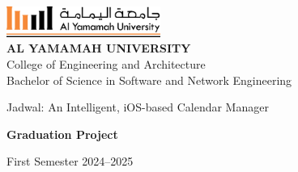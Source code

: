 \documentclass[12pt,a4paper,twoside]{report}
\begin{document}
\begin{singlespace}
    \begin{titlepage}
        \begin{center}
            \vspace*{1cm}
            \includegraphics[height=1cm]{images/yu-logo.png}\\[1cm]
            {\Large\bfseries AL YAMAMAH UNIVERSITY}\\[0.5cm]
            {\large College of Engineering and Architecture}\\[0.5cm]
            {\large Bachelor of Science in Software and Network Engineering}\\[2cm]
            {\Huge\bfseries
            \begin{spacing}{1}
                Jadwal: An Intelligent, iOS-based Calendar Manager
            \end{spacing}
            }
            \vspace{2cm}
            {\Large\bfseries Graduation Project}\\[2cm]
            \begin{center}
                \setlength{\fboxsep}{10pt}
                \setlength{\fboxrule}{1pt}
            \end{center}
            \vfill
            {\large First Semester 2024--2025}
        \end{center}
    \end{titlepage}
\end{singlespace}
\end{document}
